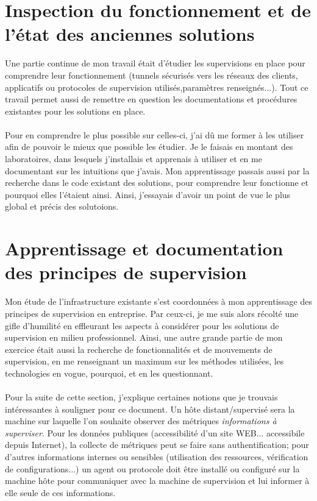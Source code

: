 \section{Inspection du fonctionnement et de l'état des anciennes solutions}

Une partie continue de mon travail était d'étudier les supervisions en place pour comprendre leur fonctionnement (tunnels sécurisés vers les réseaux des clients, applicatifs ou protocoles de supervision utilisés,paramètres renseignés...). Tout ce travail permet aussi de remettre en question les documentations et procédures existantes pour les solutions en place.
\\ \\
Pour en comprendre le plus possible sur celles-ci, j'ai dû me former à les utiliser afin de pouvoir le mieux que possible les étudier. Je le faisais en montant des laboratoires, dans lesquels j'installais et apprenais à utiliser et en me documentant sur les intuitions que j'avais. Mon apprentissage passais aussi par la recherche dans le code existant des solutions, pour comprendre leur fonctionne et pourquoi elles l'étaient ainsi. Ainsi, j'essayais d'avoir un point de vue le plus global et précis des solutoions.


\section{Apprentissage et documentation des principes de supervision}

Mon étude de l'infrastructure existante s'est coordonnées à mon apprentissage des principes de supervision en entreprise. Par ceux-ci, je me suis alors récolté une gifle d'humilité en effleurant les aspects à considérer pour les solutions de supervision en milieu professionnel. Ainsi, une autre grande partie de mon exercice était aussi la recherche de fonctionnalités et de mouvements de supervision, en me renseignant un maximum sur les méthodes utilisées, les technologies en vogue, pourquoi, et en les questionnant.
\\ \\
Pour la suite de cette section, j'explique certaines notions que je trouvais intéressantes à souligner pour ce document. Un hôte distant/supervisé sera la machine sur laquelle l'on souhaite observer des métriques \textit{informations à superviser}. Pour les données publiques (accessibilité d'un site WEB... accessibile depuis Internet), la collecte de métriques peut se faire sans authentification; pour d'autres informations internes ou sensibles (utilisation des ressources, vérification de configurations...) un agent ou protocole doit être installé ou configuré sur la machine hôte pour communiquer avec la machine de supervision et lui informer à elle seule de ces informations.

